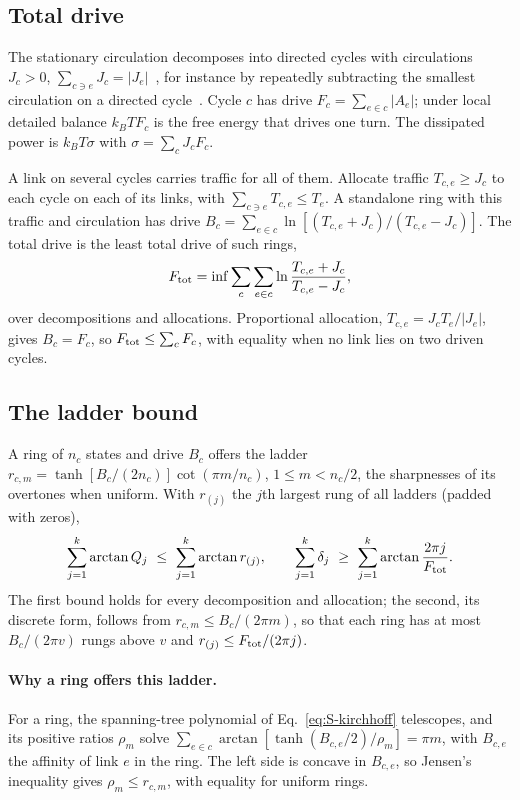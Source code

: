 \subsection{Total drive}\label{sec:ftilde}

The stationary circulation decomposes into directed cycles with circulations $J_c>0$, $\sum_{c\ni e}J_c=|J_e|$~\cite{schnakenberg1976,kalpazidou2006}, for instance by repeatedly subtracting the smallest circulation on a directed cycle~\cite{ahuja1993}. Cycle $c$ has drive $F_c=\sum_{e\in c}|A_e|$; under local detailed balance $k_BTF_c$ is the free energy that drives one turn. The dissipated power is $k_BT\sigma$ with $\sigma=\sum_cJ_cF_c$.

A link on several cycles carries traffic for all of them. Allocate traffic $T_{c,e}\ge J_c$ to each cycle on each of its links, with $\sum_{c\ni e}T_{c,e}\le T_e$. A standalone ring with this traffic and circulation has drive $B_c=\sum_{e\in c}\ln[(T_{c,e}+J_c)/(T_{c,e}-J_c)]$. The total drive is the least total drive of such rings,
\begin{equation}
F_{\mathrm{tot}}=\inf\sum_c\sum_{e\in c}\ln\frac{T_{c,e}+J_c}{T_{c,e}-J_c},
\label{eq:S-ftilde}
\end{equation}
over decompositions and allocations. Proportional allocation, $T_{c,e}=J_cT_e/|J_e|$, gives $B_c=F_c$, so $F_{\mathrm{tot}}\le\sum_cF_c$, with equality when no link lies on two driven cycles.

\subsection{The ladder bound}

A ring of $n_c$ states and drive $B_c$ offers the ladder $r_{c,m}=\tanh[B_c/(2n_c)]\cot(\pi m/n_c)$, $1\le m<n_c/2$, the sharpnesses of its overtones when uniform. With $r_{(j)}$ the $j$th largest rung of all ladders (padded with zeros),
\begin{equation}
\sum_{j=1}^{k}\arctan Q_j\ \le\ \sum_{j=1}^{k}\arctan r_{(j)},\qquad
\sum_{j=1}^{k}\delta_j\ \ge\ \sum_{j=1}^{k}\arctan\frac{2\pi j}{\Ft}.
\label{eq:S-ladder}
\end{equation}
The first bound holds for every decomposition and allocation; the second, its discrete form, follows from $r_{c,m}\le B_c/(2\pi m)$, so that each ring has at most $B_c/(2\pi v)$ rungs above $v$ and $r_{(j)}\le F_{\mathrm{tot}}/(2\pi j)$.

\paragraph*{Why a ring offers this ladder.} For a ring, the spanning-tree polynomial of Eq.~\eqref{eq:S-kirchhoff} telescopes, and its positive ratios $\rho_m$ solve $\sum_{e\in c}\arctan[\tanh(B_{c,e}/2)/\rho_m]=\pi m$, with $B_{c,e}$ the affinity of link $e$ in the ring. The left side is concave in $B_{c,e}$, so Jensen's inequality gives $\rho_m\le r_{c,m}$, with equality for uniform rings.

